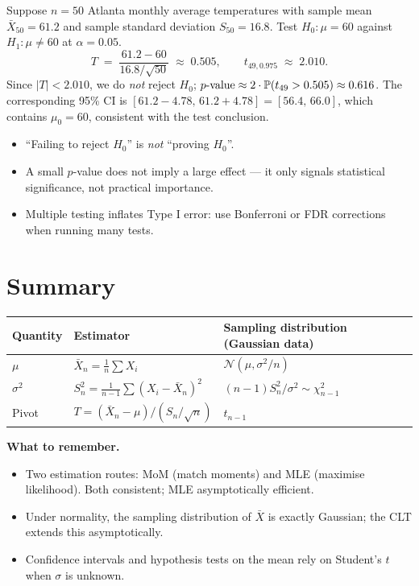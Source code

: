\begin{exbox}
Suppose $n = 50$ Atlanta monthly average temperatures with sample
mean $\bar{X}_{50} = 61.2$ and sample standard deviation $S_{50} = 16.8$.
Test $H_0 : \mu = 60$ against $H_1 : \mu \neq 60$ at $\alpha = 0.05$.
\[
  T \;=\; \frac{61.2 - 60}{16.8 / \sqrt{50}}
       \;\approx\; 0.505,
  \qquad
  t_{49, 0.975} \;\approx\; 2.010.
\]
Since $|T| < 2.010$, we do \emph{not} reject $H_0$;
$p\text{-value} \approx 2 \cdot \mathbb{P}(t_{49} > 0.505) \approx 0.616$.
\medskip
The corresponding 95\% CI is
$[61.2 - 4.78,\, 61.2 + 4.78] = [56.4,\, 66.0]$, which contains
$\mu_0 = 60$, consistent with the test conclusion.
\end{exbox}

\begin{warnbox}
\begin{itemize}
  \item ``Failing to reject $H_0$'' is \emph{not} ``proving $H_0$''.
  \item A small $p$-value does not imply a large effect — it only
        signals statistical significance, not practical importance.
  \item Multiple testing inflates Type I error: use Bonferroni or FDR
        corrections when running many tests.
\end{itemize}
\end{warnbox}

\section*{Summary}

\begin{center}
\begin{tabular}{lll}
\toprule
\textbf{Quantity} & \textbf{Estimator} & \textbf{Sampling distribution (Gaussian data)} \\
\midrule
$\mu$         & $\bar{X}_n = \tfrac{1}{n}\sum X_i$
              & $\mathcal{N}(\mu, \sigma^2/n)$ \\
$\sigma^2$    & $S_n^2 = \tfrac{1}{n-1}\sum (X_i - \bar X_n)^2$
              & $(n-1)S_n^2/\sigma^2 \sim \chi^2_{n-1}$ \\
Pivot         & $T = (\bar{X}_n - \mu)/(S_n/\sqrt{n})$
              & $t_{n-1}$ \\
\bottomrule
\end{tabular}
\end{center}

\medskip
\noindent
\textbf{What to remember.}
\begin{itemize}
  \item Two estimation routes: MoM (match moments) and MLE
        (maximise likelihood). Both consistent; MLE asymptotically
        efficient.
  \item Under normality, the sampling distribution of $\bar X$ is
        exactly Gaussian; the CLT extends this asymptotically.
  \item Confidence intervals and hypothesis tests on the mean rely on
        Student's $t$ when $\sigma$ is unknown.
\end{itemize}
